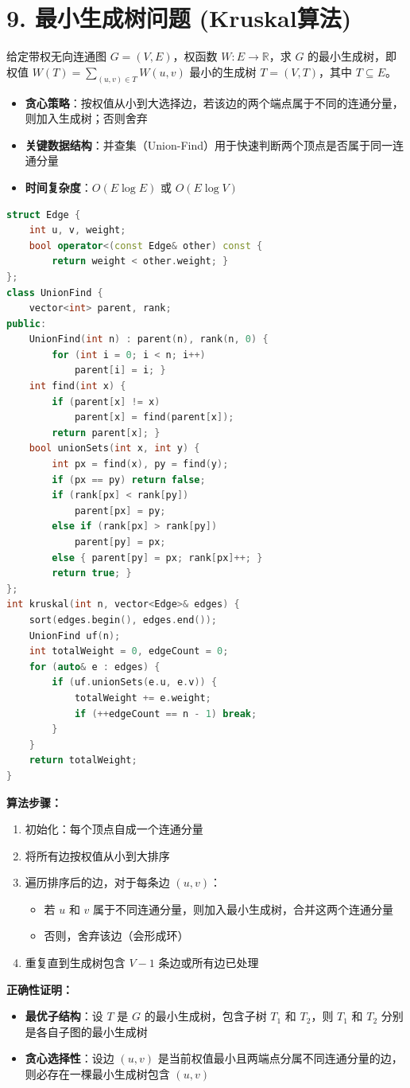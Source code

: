 \section*{9. 最小生成树问题 (Kruskal算法)}

给定带权无向连通图 $G=(V, E)$，权函数 $W: E \to \mathbb{R}$，求 $G$ 的最小生成树，即权值 $W(T) = \sum_{(u,v) \in T} W(u,v)$ 最小的生成树 $T=(V, T)$，其中 $T \subseteq E$。

\begin{itemize}
    \item \textbf{贪心策略}：按权值从小到大选择边，若该边的两个端点属于不同的连通分量，则加入生成树；否则舍弃
    \item \textbf{关键数据结构}：并查集（Union-Find）用于快速判断两个顶点是否属于同一连通分量
    \item \textbf{时间复杂度}：$O(E \log E)$ 或 $O(E \log V)$
\end{itemize}

\begin{lstlisting}[language=C++, style=cppstyle]
struct Edge {
    int u, v, weight;
    bool operator<(const Edge& other) const {
        return weight < other.weight; }
};
class UnionFind {
    vector<int> parent, rank;
public:
    UnionFind(int n) : parent(n), rank(n, 0) {
        for (int i = 0; i < n; i++)
            parent[i] = i; }
    int find(int x) {
        if (parent[x] != x)
            parent[x] = find(parent[x]);
        return parent[x]; }
    bool unionSets(int x, int y) {
        int px = find(x), py = find(y);
        if (px == py) return false;
        if (rank[px] < rank[py])
            parent[px] = py;
        else if (rank[px] > rank[py])
            parent[py] = px;
        else { parent[py] = px; rank[px]++; }
        return true; }
};
int kruskal(int n, vector<Edge>& edges) {
    sort(edges.begin(), edges.end());
    UnionFind uf(n);
    int totalWeight = 0, edgeCount = 0;
    for (auto& e : edges) {
        if (uf.unionSets(e.u, e.v)) {
            totalWeight += e.weight;
            if (++edgeCount == n - 1) break;
        }
    }
    return totalWeight;
}
\end{lstlisting}

\textbf{算法步骤：}
\begin{enumerate}
    \item 初始化：每个顶点自成一个连通分量
    \item 将所有边按权值从小到大排序
    \item 遍历排序后的边，对于每条边 $(u, v)$：
    \begin{itemize}
        \item 若 $u$ 和 $v$ 属于不同连通分量，则加入最小生成树，合并这两个连通分量
        \item 否则，舍弃该边（会形成环）
    \end{itemize}
    \item 重复直到生成树包含 $V-1$ 条边或所有边已处理
\end{enumerate}

\textbf{正确性证明：}
\begin{itemize}
    \item \textbf{最优子结构}：设 $T$ 是 $G$ 的最小生成树，包含子树 $T_1$ 和 $T_2$，则 $T_1$ 和 $T_2$ 分别是各自子图的最小生成树
    \item \textbf{贪心选择性}：设边 $(u, v)$ 是当前权值最小且两端点分属不同连通分量的边，则必存在一棵最小生成树包含 $(u, v)$
\end{itemize}
